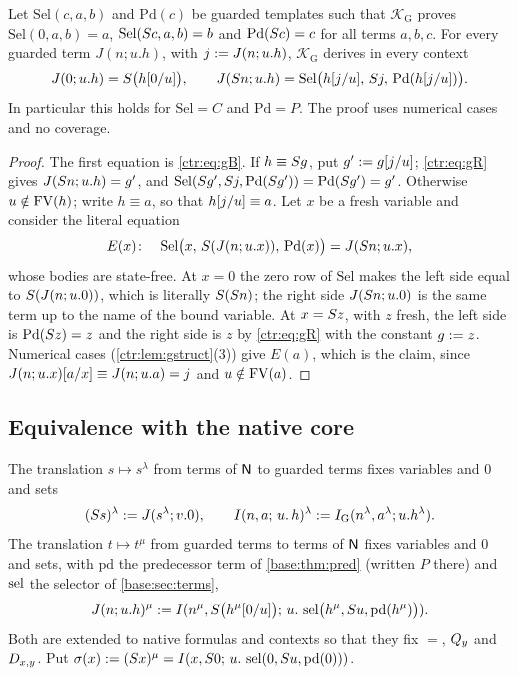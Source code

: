 \begin{lemma}\label{ctr:lem:grec}
Let $\mathrm{Sel}(c,a,b)$ and $\mathrm{Pd}(c)$ be guarded templates such that
$\mathcal K_{\mathrm G}$ proves $\mathrm{Sel}(0,a,b)=a$, $\mathrm{Sel}(S c,a,b)=b$ and
$\mathrm{Pd}(S c)=c$ for all terms $a,b,c$. For every guarded term $J(n;u.h)$, with
$j\mathrel{:=} J(n;u.h)$, $\mathcal K_{\mathrm G}$ derives in every context
\[
 J(0;u.h)=S\bigl(h[0/u]\bigr),\qquad
 J(S n;u.h)=\mathrm{Sel}\bigl(h[j/u],\,S j,\,\mathrm{Pd}(h[j/u])\bigr).
\]
In particular this holds for $\mathrm{Sel}=C$ and $\mathrm{Pd}=P$. The proof uses numerical
cases and no coverage.
\end{lemma}
\begin{proof}
The first equation is \eqref{ctr:eq:gB}. If $h\equiv S g$, put $g'\mathrel{:=} g[j/u]$;
\eqref{ctr:eq:gR} gives $J(S n;u.h)=g'$, and
$\mathrm{Sel}(S g',S j,\mathrm{Pd}(S g'))=\mathrm{Pd}(S g')=g'$. Otherwise
$u\notin\operatorname{FV}(h)$; write $h\equiv a$, so that $h[j/u]\equiv a$. Let $x$ be a fresh
variable and consider the literal equation
\[
 E(x)\colon\quad \mathrm{Sel}\bigl(x,\,S(J(n;u.x)),\,\mathrm{Pd}(x)\bigr)=J(S n;u.x),
\]
whose bodies are state-free. At $x=0$ the zero row of $\mathrm{Sel}$ makes the left side
equal to $S(J(n;u.0))$, which is literally $S(S n)$; the right side $J(S n;u.0)$
is the same term up to the name of the bound variable. At $x=S z$, with $z$
fresh, the left side is $\mathrm{Pd}(S z)=z$ and the right side is $z$ by
\eqref{ctr:eq:gR} with the constant $g\mathrel{:=} z$. Numerical cases
(\cref{ctr:lem:gstruct}(3)) give $E(a)$, which is the claim, since
$J(n;u.x)[a/x]\equiv J(n;u.a)=j$ and $u\notin\operatorname{FV}(a)$.
\end{proof}

\subsection{Equivalence with the native core}

\begin{definition}[Translations]\label{ctr:def:gtrans}
The translation $s\mapsto s^\lambda$ from terms of $\mathsf{N}$ to guarded terms fixes variables
and $0$ and sets
\[
 (S s)^\lambda\mathrel{:=} J(s^\lambda;v.0),\qquad
 I(n,a;\,u.\,h)^\lambda\mathrel{:=} I_{\mathrm G}(n^\lambda,a^\lambda;u.h^\lambda).
\]
The translation $t\mapsto t^\mu$ from guarded terms to terms of $\mathsf{N}$ fixes variables and
$0$ and sets, with $\mathrm{pd}$ the predecessor term of \cref{base:thm:pred} (written $P$
there) and $\operatorname{sel}$ the selector of \cref{base:sec:terms},
\[
 J(n;u.h)^\mu\mathrel{:=}
 I(n^\mu,S\bigl(h^\mu[0/u]\bigr);\,u.\,\operatorname{sel}\bigl(h^\mu,S u,\mathrm{pd}(h^\mu)\bigr)).
\]
Both are extended to native formulas and contexts so that they fix $=$, $Q_{y}$ and
$D_{x,y}$. Put $\sigma(x)\mathrel{:=}(S x)^\mu=I(x,S 0;\,u.\,\operatorname{sel}(0,S u,\mathrm{pd}(0)))$.
\end{definition}

